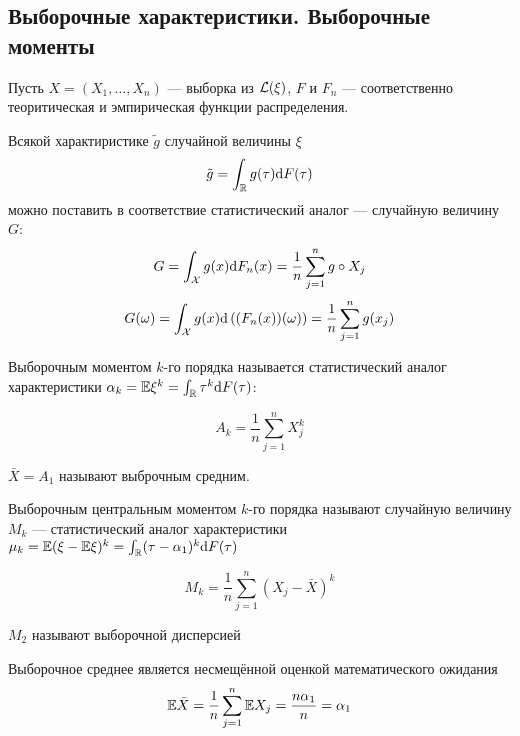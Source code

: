 \subsection{Выборочные характеристики. Выборочные моменты}

Пусть $X = (X_1, \dotsc, X_n)$ --- выборка из $\mathcal L(\xi)$,
$F$ и $F_n$ --- соответственно теоритическая и эмпирическая функции распределения.

Всякой характиристике $\tilde g$ случайной величины $\xi$
$$\tilde g = \int_\mathbb R g(\tau) \mathrm d F(\tau)$$
можно поставить в соответствие статистический аналог
--- случайную величину $G$:
$$G = \int_\mathcal X g(x) \mathrm d F_n(x) = \frac{1}{n} \sum_{j=1}^n g\circ X_j$$
$$G(\omega)
= \int_\mathcal X g(x) \mathrm d\left((F_n(x))(\omega)\right)
= \frac{1}{n} \sum_{j=1}^n g(x_j)$$

Выборочным моментом $k$-го порядка называется
статистический аналог характеристики $\alpha_k = \mathbb E \xi^k = \int_\mathbb R \tau^k \mathrm d F(\tau)$:

$$A_k = \frac{1}{n} \sum_{j=1}^n X_j^k$$

$\bar X = A_1$ называют выброчным средним.

Выборочным центральным моментом $k$-го порядка
называют случайную величину $M_k$
--- статистический аналог характеристики $\mu_k = \mathbb E (\xi - \mathbb E \xi)^k = \int_\mathbb R (\tau - \alpha_1)^k \mathrm d F(\tau)$

$$M_k = \frac{1}{n} \sum_{j=1}^n \left( X_j - \bar X \right)^k$$

$M_2$ называют выборочной дисперсией

\begin{nb}{Выборочное среднее является несмещённой оценкой математического ожидания}
$$\mathbb E \bar X = \frac{1}{n}\sum_{j=1}^n \mathbb E X_j = \frac{n \alpha_1}{n} = \alpha_1$$
\end{nb}
